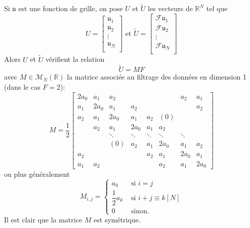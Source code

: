 Si $\mathfrak{u}$ est une fonction de grille, on pose $U$ et $\tilde{U}$ les vecteurs de $\mathbb{R}^N$ tel que
\begin{equation}
U = \begin{bmatrix}
\mathfrak{u}_1\\
\mathfrak{u}_2\\
\vdots \\
\mathfrak{u}_N\\
\end{bmatrix} \text{ et } 
\tilde{U} = \begin{bmatrix}
\mathcal{F}\mathfrak{u}_1\\
\mathcal{F}\mathfrak{u}_2\\
\vdots \\
\mathcal{F}\mathfrak{u}_N\\
\end{bmatrix}
\end{equation}
Alors $U$ et $\tilde{U}$ vérifient la relation
\begin{equation}
\tilde{U} = M F
\end{equation}
avec $M \in \mathcal{M}_N \left( \mathbb{R} \right)$ la matrice associée au filtrage des données en dimension 1 (dans le cas $F=2$):
\begin{equation}
M = \dfrac{1}{2}
\begin{bmatrix}
2a_0 & a_1 & a_2 &   &   &   & a_2 & a_1 \\ 
a_1 & 2 a_0 & a_1 & a_2 &   &   &   & a_2 \\ 
a_2 & a_1 & 2a_0 & a_1 & a_2 & (0) &   &   \\ 
  & a_2 & a_1 & 2a_0 & a_1 & a_2 &   &   \\ 
  &   & \ddots & \ddots & \ddots & \ddots & \ddots &   \\ 
  &   & (0) & a_2 & a_1 & 2 a_0 & a_1 & a_2 \\ 
a_2 &   &   &   & a_2 & a_1 & 2a_0 & a_1 \\ 
a_1 & a_2 &   &   &   & a_2 & a_1 & 2a_0
\end{bmatrix} 
\end{equation}
ou plus généralement 
\begin{equation}
M_{i,j} = \left\lbrace
\begin{array}{cl}
a_0 & \text{ si } i=j \\
\dfrac{1}{2} a_k & \text{ si } i+j \equiv k [N]\\
0 & \text{ sinon.}
\end{array}
\right.
\end{equation}
Il est clair que la matrice $M$ est symétrique.








